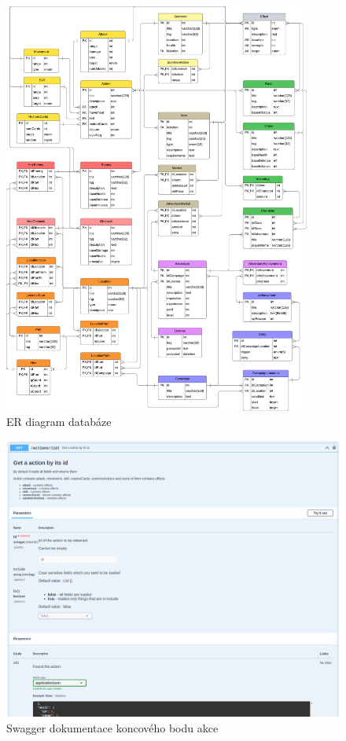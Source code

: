 \begin{figure}[h]
    \centering
    \includegraphics[width=0.9\textwidth]{../../shared/diagrams/dbScheme.pdf}
    \caption{ER diagram databáze}
    \label{fig:dix:database_schema}
\end{figure}

\begin{figure}[h] %
    \centering
    \includegraphics[width=\textwidth]{figures/impl/endpointSwagger.png}
    \caption{Swagger dokumentace koncového bodu akce}
    \label{fig:action:endpoint}
\end{figure}